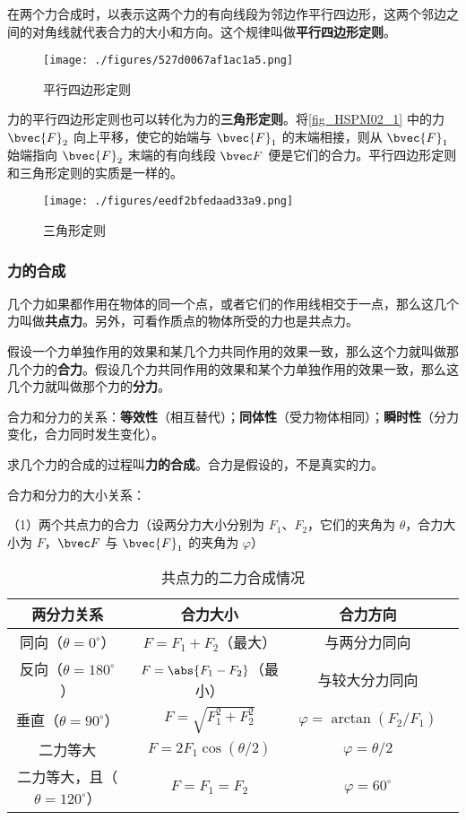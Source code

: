 在两个力合成时，以表示这两个力的有向线段为邻边作平行四边形，这两个邻边之间的对角线就代表合力的大小和方向。这个规律叫做\textbf{平行四边形定则}。
\begin{figure}[ht]
\centering
\texttt{[image: ./figures/527d0067af1ac1a5.png]}
\caption{平行四边形定则} \label{fig_HSPM02_1}
\end{figure}

力的平行四边形定则也可以转化为力的\textbf{三角形定则}。将\autoref{fig_HSPM02_1} 中的力 $\bvec {F}_2$ 向上平移，使它的始端与 $\bvec {F}_1$ 的末端相接，则从 $\bvec {F}_1$ 始端指向 $\bvec {F}_2$ 末端的有向线段 $\bvec F$ 便是它们的合力。平行四边形定则和三角形定则的实质是一样的。
\begin{figure}[ht]
\centering
\texttt{[image: ./figures/eedf2bfedaad33a9.png]}
\caption{三角形定则} \label{fig_HSPM02_2}
\end{figure}

\subsubsection{力的合成}
几个力如果都作用在物体的同一个点，或者它们的作用线相交于一点，那么这几个力叫做\textbf{共点力}。另外，可看作质点的物体所受的力也是共点力。

假设一个力单独作用的效果和某几个力共同作用的效果一致，那么这个力就叫做那几个力的\textbf{合力}。假设几个力共同作用的效果和某个力单独作用的效果一致，那么这几个力就叫做那个力的\textbf{分力}。

合力和分力的关系：\textbf{等效性}（相互替代）；\textbf{同体性}（受力物体相同）；\textbf{瞬时性}（分力变化，合力同时发生变化）。

求几个力的合成的过程叫\textbf{力的合成}。合力是假设的，不是真实的力。

合力和分力的大小关系：

（1）两个共点力的合力（设两分力大小分别为 $F_1$、$F_2$，它们的夹角为 $\theta$，合力大小为 $F$，$\bvec F$ 与 $\bvec {F}_1$ 的夹角为 $\varphi $）

\begin{table}[ht]
\centering
\caption{共点力的二力合成情况}\label{tab_HSPM02_1}
\begin{tabular}{|c|c|c|c|}
\hline
两分力关系 &  合力大小 & 合力方向 \\
\hline
同向（$\theta=0^{\circ}$） &  $F=F_1+F_2$（最大） & 与两分力同向 \\
\hline
反向（$\theta=180^{\circ}$） &  $F=\abs{F_1-F_2}$（最小） & 与较大分力同向 \\
\hline
垂直（$\theta=90^{\circ}$） &  $F=\sqrt{F_1^2+F_2^2}$ & $\varphi=\arctan{(F_2/F_1)}$ \\
\hline
二力等大 &  $F=2F_1\cos{(\theta/2)}$ & $\varphi=\theta/2$ \\
\hline
二力等大，且（$\theta=120^{\circ}$） &  $F=F_1=F_2$ & $\varphi=60^{\circ}$ \\
\hline
\end{tabular}
\end{table}

